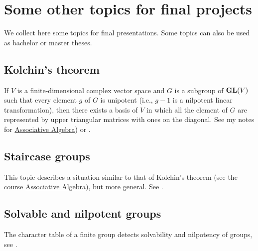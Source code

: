 \section*{Some other topics for final projects}

\pagestyle{plain}
\fancyhf{}
\fancyfoot[CE,CO]{\leftmark}
\fancyfoot[LE,RO]{\thepage}

We collect here some topics for final presentations. Some topics
can also be used as bachelor or master theses. 

\subsection*{Kolchin's theorem}

If $V$ is a finite-dimensional complex 
vector space and $G$ is a subgroup of $\mathbf{GL}(V)$ such that every element $g$ of $G$ is unipotent (i.e., $g - 1$ is a nilpotent linear transformation), then there exists a basis of $V$ in which 
all the element of $G$ are represented by upper triangular matrices with ones on the diagonal. See my
notes for \href{https://github.com/vendramin/associative/}{Associative Algebra}) or \cite[Chapter 2]{MR1369573}.

\subsection*{Staircase groups}

This topic describes a situation similar to that of Kolchin's theorem (see the course \href{https://github.com/vendramin/associative/}{Associative Algebra}), but
more general. See \cite[Chapter 5]{MR1369573}.

\subsection*{Solvable and nilpotent groups}

The character table of a finite group
detects solvability and nilpotency of groups, see
\cite[Chapter 6]{MR1369573}.



